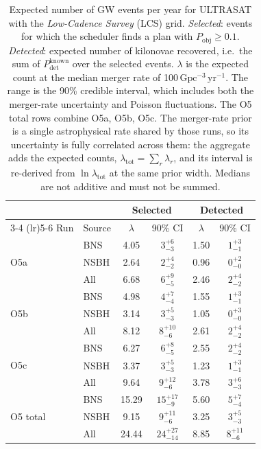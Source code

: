\begin{table}[!htb]
\centering
\renewcommand\arraystretch{1.15}
\setlength{\tabcolsep}{0.22cm}
\caption{Expected number of GW events per year for ULTRASAT with the \emph{Low-Cadence Survey} (LCS) grid. \emph{Selected}: events for which the scheduler finds a plan with $P_\mathrm{obj} \geq 0.1$. \emph{Detected}: expected number of kilonovae recovered, i.e.\ the sum of $P_\mathrm{det}^\mathrm{known}$ over the selected events. $\lambda$ is the expected count at the median merger rate of 100\,$\mathrm{Gpc^{-3}\,yr^{-1}}$. The range is the 90\% credible interval, which includes both the merger-rate uncertainty and Poisson fluctuations. The O5 total rows combine O5a, O5b, O5c. The merger-rate prior is a single astrophysical rate shared by those runs, so its uncertainty is fully correlated across them: the aggregate adds the expected counts, $\lambda_\mathrm{tot} = \sum_r \lambda_r$, and its interval is re-derived from $\ln \lambda_\mathrm{tot}$ at the same prior width. Medians are not additive and must not be summed.}
\label{tab:ultrasat-non-overlap-selected-detected-1yr}
\begin{tabular}{llcccc}
\toprule
 & & \multicolumn{2}{c}{Selected} & \multicolumn{2}{c}{Detected} \\
\cmidrule(lr){3-4} \cmidrule(lr){5-6}
Run & Source & $\lambda$ & 90\% CI & $\lambda$ & 90\% CI \\
\midrule
\multirow{3}{*}{O5a} & BNS  & 4.05 & $3^{+6}_{-3}$ & 1.50 & $1^{+3}_{-1}$ \\
                     & NSBH & 2.64 & $2^{+4}_{-2}$ & 0.96 & $0^{+2}_{-0}$ \\
                     & All  & 6.68 & $6^{+9}_{-5}$ & 2.46 & $2^{+4}_{-2}$ \\
\midrule
\multirow{3}{*}{O5b} & BNS  & 4.98 & $4^{+7}_{-4}$ & 1.55 & $1^{+3}_{-1}$ \\
                     & NSBH & 3.14 & $3^{+5}_{-3}$ & 1.05 & $0^{+3}_{-0}$ \\
                     & All  & 8.12 & $8^{+10}_{-6}$ & 2.61 & $2^{+4}_{-2}$ \\
\midrule
\multirow{3}{*}{O5c} & BNS  & 6.27 & $6^{+8}_{-5}$ & 2.55 & $2^{+4}_{-2}$ \\
                     & NSBH & 3.37 & $3^{+5}_{-3}$ & 1.23 & $1^{+3}_{-1}$ \\
                     & All  & 9.64 & $9^{+12}_{-6}$ & 3.78 & $3^{+6}_{-3}$ \\
\midrule
\multirow{3}{*}{O5 total} & BNS  & 15.29 & $15^{+17}_{-9}$ & 5.60 & $5^{+7}_{-4}$ \\
                          & NSBH & 9.15 & $9^{+11}_{-6}$ & 3.25 & $3^{+5}_{-3}$ \\
                          & All  & 24.44 & $24^{+27}_{-14}$ & 8.85 & $8^{+11}_{-6}$ \\
\bottomrule
\end{tabular}
\end{table}
